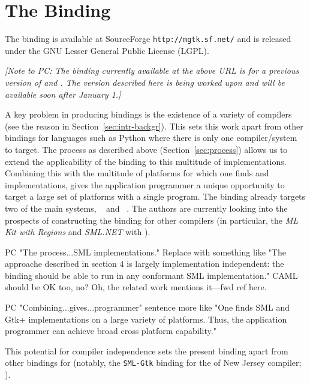 \documentclass[workingdraft]{usetex-v1}
\begin{document}
\section{The \mgtk Binding}
\label{sec:mgtk-binding}

The \mgtk binding is available at SourceForge \texttt{http://mgtk.sf.net/}
and is released under the GNU Lesser General Public License
(LGPL).

\textit{[Note to PC: The binding currently available at the above URL
  is for a previous version of \mgtk and \gtk. The version described here is
  being worked upon and will be available soon after January 1.]}

A key problem in producing \sml bindings is the existence of a variety
of compilers (see the reason in Section~\ref{sec:intr-backgr}). This
sets this work apart from other bindings for languages such as Python
where there is only one compiler/system to target. The process as
described above (Section~\ref{sec:process}) allows us to extend the
applicability of the binding to this multitude of \sml
implementations. Combining this with the multitude of platforms for
which one finds \sml and \gtk implementations, gives the application
programmer a unique opportunity to target a large set of platforms
with a single program. The \mgtk binding already targets two of the
main \sml systems, \mosml~\cite{Mosml-webpage:2003} and
\mlton~\cite{MLton-webpage:2003}. The authors are currently looking
into the prospects of constructing the binding for other \sml
compilers (in particular, the \emph{ML Kit with Regions}
\cite{MLKit-webpage:2003} and \emph{SML.NET}
\cite{SML.NET-webpage:2003} with \gtksharp).

\begin{ednote}{PC}
  "The process...SML implementations."  Replace with something like
  "The approache described in section 4 is largely implementation
  independent: the binding should be able to run in any conformant SML
  implementation."  CAML should be OK too, no?  Oh, the related work
  mentions it---fwd ref here.
\end{ednote}


\begin{ednote}{PC}
  "Combining...gives...programmer" sentence more like "One finds SML
  and Gtk+ implementations on a large variety of platforms.  Thus, the
  application programmer can achieve broad cross platform capability."
\end{ednote}

This potential for compiler independence sets the present
binding apart from other \gtk bindings for \sml (notably, the
\texttt{SML-Gtk} binding for the \sml of New Jersey \sml compiler;
\cite{SML-Gtk-webpage:2003}).
\end{document}
